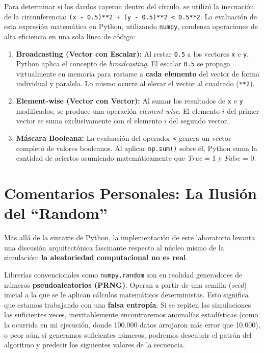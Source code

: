 \documentclass[11pt]{article}
\begin{document}
Para determinar si los dardos cayeron dentro del círculo, se utilizó la inecuación de la circunferencia: \texttt{(x - 0.5)**2 + (y - 0.5)**2 < 0.5**2}. La evaluación de esta expresión matemática en Python, utilizando \texttt{numpy}, condensa operaciones de alta eficiencia en una sola línea de código:

\begin{enumerate}
    \item \textbf{Broadcasting (Vector con Escalar):} Al restar \texttt{0.5} a los vectores \texttt{x} e \texttt{y}, Python aplica el concepto de \textit{broadcasting}. El escalar \texttt{0.5} se propaga virtualmente en memoria para restarse a \textbf{cada elemento} del vector de forma individual y paralela. Lo mismo ocurre al elevar el vector al cuadrado (\texttt{**2}).
    \item \textbf{Element-wise (Vector con Vector):} Al sumar los resultados de \texttt{x} e \texttt{y} modificados, se produce una operación \textit{element-wise}. El elemento $i$ del primer vector se suma exclusivamente con el elemento $i$ del segundo vector.
    \item \textbf{Máscara Booleana:} La evaluación del operador \texttt{<} genera un vector completo de valores booleanos. Al aplicar \texttt{np.sum()} sobre él, Python suma la cantidad de aciertos asumiendo matemáticamente que \textit{True} = 1 y \textit{False} = 0.
\end{enumerate}

\section{Comentarios Personales: La Ilusión del ``Random''}

Más allá de la sintaxis de Python, la implementación de este laboratorio levanta una discusión arquitectónica fascinante respecto al núcleo mismo de la simulación: \textbf{la aleatoriedad computacional no es real}. 

Librerías convencionales como \texttt{numpy.random} son en realidad generadores de números \textbf{pseudoaleatorios (PRNG)}. Operan a partir de una semilla (\textit{seed}) inicial a la que se le aplican cálculos matemáticos deterministas. Esto significa que estamos trabajando con una \textbf{falsa entropía}. Si se repiten las simulaciones las suficientes veces, inevitablemente encontraremos anomalías estadísticas (como la ocurrida en mi ejecución, donde 100.000 datos arrojaron más error que 10.000), o peor aún, si generamos suficientes números, podremos descubrir el patrón del algoritmo y predecir los siguientes valores de la secuencia.
\end{document}
